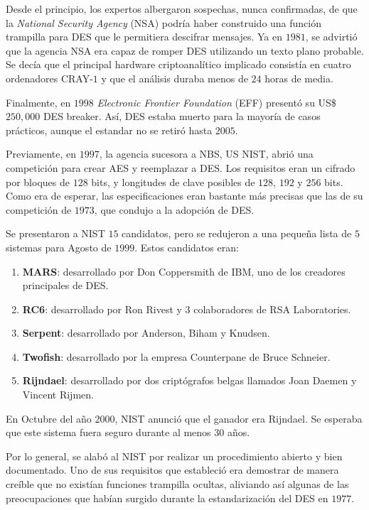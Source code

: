    Desde el principio, los expertos albergaron sospechas, nunca confirmadas, de que la \textit{National Security Agency} (NSA) podría haber construido una función trampilla para DES que le permitiera descifrar mensajes. Ya en $1981$, se advirtió que la agencia NSA era capaz de romper DES utilizando un texto plano probable. Se decía que el principal hardware criptoanalítico implicado consistía en cuatro ordenadores CRAY-$1$ y que el análisis duraba menos de $24$ horas de media.

    Finalmente, en $1998$ \textit{Electronic Frontier Foundation} (EFF) presentó su  US\$ $250,000$ DES breaker. Así, DES estaba muerto para la mayoría de casos prácticos, aunque el estandar no se retiró hasta $2005$. 
    
    Previamente, en $1997$, la agencia sucesora a NBS, US NIST, abrió una competición para crear AES y reemplazar a DES. Los requisitos eran un cifrado por bloques de $128$ bits, y longitudes de clave posibles de $128$, $192$ y $256$ bits. Como era de esperar, las especificaciones eran bastante más precisas que las de su competición de $1973$, que condujo a la adopción de DES. 
    
    Se presentaron a NIST $15$ candidatos, pero se redujeron a una pequeña lista de $5$ sistemas para Agosto de $1999$. Estos candidatos eran:

    \begin{enumerate}
        \item \textbf{MARS}: desarrollado por Don Coppersmith de IBM, uno de los creadores principales de DES.
        \item \textbf{RC6}: desarrollado por Ron Rivest y $3$ colaboradores de RSA Laboratories.
        \item \textbf{Serpent}: desarrollado por Anderson, Biham y Knudsen.
        \item \textbf{Twofish}: desarrollado por la empresa Counterpane de Bruce Schneier.
        \item \textbf{Rijndael}: desarrollado por dos criptógrafos belgas llamados Joan Daemen y Vincent Rijmen.
    \end{enumerate}

    En Octubre del año $2000$, NIST anunció que el ganador era Rijndael. Se esperaba que este sistema fuera seguro durante al menos $30$ años.

    Por lo general, se alabó al NIST por realizar un procedimiento abierto y bien documentado. Uno de sus requisitos que estableció era demostrar de manera creíble que no existían funciones trampilla ocultas, aliviando así algunas de las preocupaciones que habían surgido durante la estandarización del DES en $1977$.

